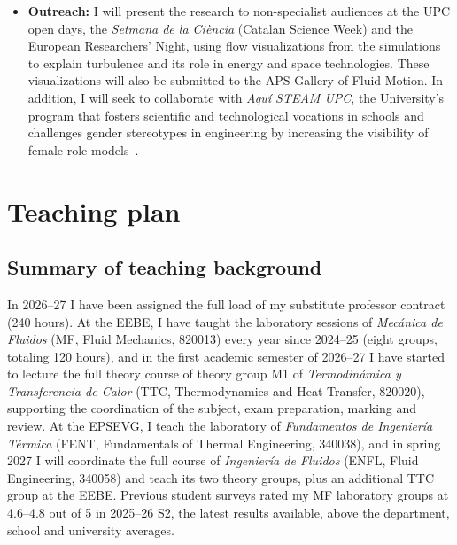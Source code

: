 \documentclass[11pt]{article}
\begin{document}
\begin{itemize}
  transferred through industrial doctorates and research contracts managed by the UPC transfer
  services. The space sector offers a particularly timely opportunity. Spain is investing
  \texteuro{}40.5 million in the development of its first small-satellite launcher~\cite{CDTI2024},
  while the Future Launchers Preparatory Programme (FLPP) of the European Space Agency (ESA) is
  advancing high-thrust liquid propulsion~\cite{ESA2026}. In this context, three Spanish companies are natural prospective partners: PLD Space, the
  contractor of the national launcher; the Barcelona-based Pangea Aerospace, which designs
  regeneratively cooled engines using real-fluid models~\cite{Esnault2021}; and Outrigo, a metal
  additive-manufacturing company that designs and builds aerospace hardware in Spain~\cite{Outrigo2026}.
  \item \textbf{Outreach:} I will present the research to non-specialist audiences at the UPC open
  days, the \textit{Setmana de la Ci\`encia} (Catalan Science Week) and the European Researchers'
  Night, using flow visualizations from the simulations to explain turbulence and its role in energy
  and space technologies. These visualizations will also be submitted to the APS Gallery of Fluid
  Motion. In addition, I will seek to collaborate with \textit{Aqu\'i STEAM UPC}, the University's
  program that fosters scientific and technological vocations in schools and challenges gender
  stereotypes in engineering by increasing the visibility of female role models~\cite{AquiSTEAM}.
\end{itemize}

\section{Teaching plan}\label{sec:teaching}

\subsection{Summary of teaching background}
In 2026--27 I have been assigned the full load of my substitute professor contract (240 hours). 
At the EEBE, I have taught the laboratory sessions of \textit{Mec\'anica de Fluidos} (MF, Fluid Mechanics, 820013) every year since 2024--25 (eight groups, totaling 120 hours), and in the first academic semester of 2026--27 I have started to lecture the full theory course of theory group M1 of \textit{Termodin\'amica y Transferencia de Calor} (TTC, Thermodynamics and Heat Transfer, 820020), supporting the coordination of the subject, exam preparation, marking and review. 
At the EPSEVG, I teach the laboratory of \textit{Fundamentos de Ingenier\'ia T\'ermica}
(FENT, Fundamentals of Thermal Engineering, 340038), and in spring 2027 I will coordinate the full course of \textit{Ingenier\'ia de Fluidos} (ENFL, Fluid Engineering, 340058) and teach its two theory groups, plus an additional TTC group at the EEBE. 
Previous student surveys rated my MF laboratory groups at 4.6--4.8 out of 5 in 2025--26 S2, the latest results available, above the department, school and
university averages.
\end{document}
